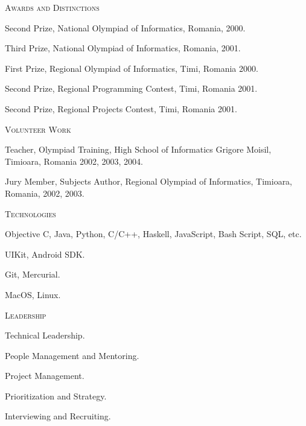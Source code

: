 \documentclass[10pt]{article}
\begin{document}
\noindent
\textcolor{Primary}{{\large \textsc{Awards and Distinctions}}}
\begin{list}{}{\leftmargin=0em}
  \setlength{\itemsep}{1pt}
  \setlength{\parskip}{0pt}
  \setlength{\parsep}{0pt}
  \item{Second Prize, National Olympiad of Informatics, Romania, 2000.}
  \item{Third Prize, National Olympiad of Informatics, Romania, 2001.}
  \item{First Prize, Regional Olympiad of Informatics, Timi, Romania 2000.}
  \item{Second Prize, Regional Programming Contest, Timi, Romania 2001.}
  \item{Second Prize, Regional Projects Contest, Timi, Romania 2001.}
\end{list}

\vspace{0.16in}

\noindent
\textcolor{Primary}{{\large \textsc{Volunteer Work}}}
\begin{list}{}{\leftmargin=0em}
  \setlength{\itemsep}{1pt}
  \setlength{\parskip}{0pt}
  \setlength{\parsep}{0pt}
  \item{Teacher, Olympiad Training, High School of Informatics Grigore Moisil, Timioara, Romania 2002, 2003, 2004.}
  \item{Jury Member, Subjects Author, Regional Olympiad of Informatics, Timioara, Romania, 2002, 2003.}
\end{list}

\vspace{0.16in}

\noindent
\textcolor{Primary}{{\large \textsc{Technologies}}}
\begin{list}{}{\leftmargin=0em}
  \setlength{\itemsep}{1pt}
  \setlength{\parskip}{0pt}
  \setlength{\parsep}{0pt}
  \item{Objective C, Java, Python, C/C++, Haskell, JavaScript, Bash Script, SQL, etc.}
  \item{UIKit, Android SDK.}
  \item{Git, Mercurial.}
  \item{MacOS, Linux.}
\end{list}

\vspace{0.16in}

\noindent
\textcolor{Primary}{{\large \textsc{Leadership}}}
\begin{list}{}{\leftmargin=0em}
  \setlength{\itemsep}{1pt}
  \setlength{\parskip}{0pt}
  \setlength{\parsep}{0pt}
  \item{Technical Leadership.}
  \item{People Management and Mentoring.}
  \item{Project Management.}
  \item{Prioritization and Strategy.}
  \item{Interviewing and Recruiting.}
\end{list}
\end{document}
